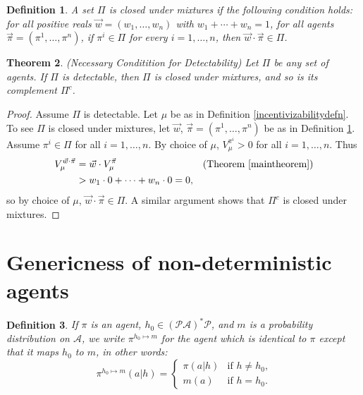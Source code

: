 \documentclass{article}
\newtheorem{theorem}{Theorem}
\newtheorem{definition}[theorem]{Definition}
\begin{document}
\begin{definition}
\label{mixtureclosuredef}
    A set $\Pi$ is \emph{closed under mixtures} if the following
    condition holds: for all positive reals $\vec w=(w_1,\ldots,w_n)$
    with $w_1+\cdots+w_n=1$,
    for all agents $\vec\pi=(\pi^1,\ldots,\pi^n)$,
    if $\pi^i\in \Pi$ for every $i=1,\ldots,n$, then
    $\vec w\cdot\vec\pi\in\Pi$.
\end{definition}

\begin{theorem}
\label{closuretheorem}
    (Necessary Conditition for Detectability)
    Let $\Pi$ be any set of agents.
    If $\Pi$ is detectable, then $\Pi$ is closed under mixtures, and so
    is its complement $\Pi^c$.
\end{theorem}

\begin{proof}
    Assume $\Pi$ is detectable.
    Let $\mu$ be as in
    Definition \ref{incentivizabilitydefn}.
    To see $\Pi$ is closed under mixtures, let $\vec w$, $\vec\pi=(\pi^1,\ldots,\pi^n)$ be
    as in Definition \ref{mixtureclosuredef}.
    Assume $\pi^i\in\Pi$ for all $i=1,\ldots,n$.
    By choice of $\mu$, $V^{\pi^i}_\mu>0$ for all $i=1,\ldots,n$.
    Thus
    \begin{align*}
        V^{\vec w\cdot\vec\pi}_\mu
            &= \vec w\cdot V^{\vec\pi}_\mu
                &\mbox{(Theorem \ref{maintheorem})}\\
            &> w_1\cdot 0 + \cdots + w_n\cdot 0 = 0,
    \end{align*}
    so by choice of $\mu$, $\vec w\cdot \vec\pi\in \Pi$.
    A similar argument shows that $\Pi^c$ is closed under mixtures.
\end{proof}


\section{Genericness of non-deterministic agents}

\begin{definition}
\label{modifyagentatoneplace}
    If $\pi$ is an agent, $h_0\in(\mathcal P\mathcal A)^*\mathcal P$,
    and $m$ is a probability distribution on $\mathcal A$,
    we write $\pi^{h_0\mapsto m}$ for the agent which is identical to $\pi$
    except that it maps $h_0$ to $m$, in other words:
    \[
        \pi^{h_0\mapsto m}(a|h)
        =
        \begin{cases}
            \pi(a|h) &\mbox{if $h\not=h_0$,}\\
            m(a) &\mbox{if $h=h_0$.}
        \end{cases}
    \]
\end{definition}
\end{document}
